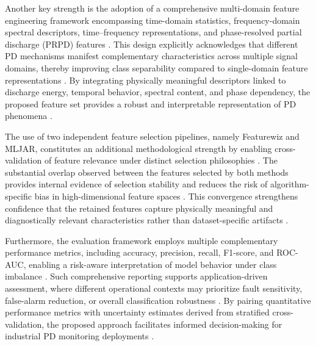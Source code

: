 Another key strength is the adoption of a comprehensive multi-domain feature engineering framework encompassing time-domain statistics, frequency-domain spectral descriptors, time--frequency representations, and phase-resolved partial discharge (PRPD) features \parencite{Aldosari_2023, Long_2024}. 
This design explicitly acknowledges that different PD mechanisms manifest complementary characteristics across multiple signal domains, thereby improving class separability compared to single-domain feature representations \parencite{Aldosari_2023, Long_2024}. 
By integrating physically meaningful descriptors linked to discharge energy, temporal behavior, spectral content, and phase dependency, the proposed feature set provides a robust and interpretable representation of PD phenomena \parencite{Florkowski_2024, Long_2024}.

The use of two independent feature selection pipelines, namely Featurewiz and MLJAR, constitutes an additional methodological strength by enabling cross-validation of feature relevance under distinct selection philosophies \parencite{Seitz_2024_1, Zhang_2024_29}. 
The substantial overlap observed between the features selected by both methods provides internal evidence of selection stability and reduces the risk of algorithm-specific bias in high-dimensional feature spaces \parencite{Zhang_2024_29, Seitz_2024_1}. 
This convergence strengthens confidence that the retained features capture physically meaningful and diagnostically relevant characteristics rather than dataset-specific artifacts \parencite{Seitz_2024_1, Long_2024}.

Furthermore, the evaluation framework employs multiple complementary performance metrics, including accuracy, precision, recall, F1-score, and ROC-AUC, enabling a risk-aware interpretation of model behavior under class imbalance \parencite{Zemouri_2023_1, Adhikari_2024}. 
Such comprehensive reporting supports application-driven assessment, where different operational contexts may prioritize fault sensitivity, false-alarm reduction, or overall classification robustness \parencite{Zemouri_2023_1, Adhikari_2024}. 
By pairing quantitative performance metrics with uncertainty estimates derived from stratified cross-validation, the proposed approach facilitates informed decision-making for industrial PD monitoring deployments \parencite{Seitz_2024_1, Florkowski_2024}.


